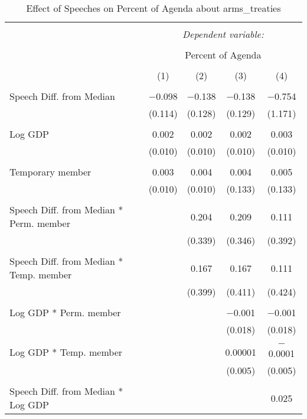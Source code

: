 
\begin{table}[!htbp] \centering 
  \caption{Effect of Speeches on Percent of Agenda about arms_treaties} 
  \label{} 
\begin{tabular}{@{\extracolsep{5pt}}lcccc} 
\\[-1.8ex]\hline 
\hline \\[-1.8ex] 
 & \multicolumn{4}{c}{\textit{Dependent variable:}} \\ 
\cline{2-5} 
\\[-1.8ex] & \multicolumn{4}{c}{Percent of Agenda} \\ 
\\[-1.8ex] & (1) & (2) & (3) & (4)\\ 
\hline \\[-1.8ex] 
 Speech Diff. from Median & $-$0.098 & $-$0.138 & $-$0.138 & $-$0.754 \\ 
  & (0.114) & (0.128) & (0.129) & (1.171) \\ 
  & & & & \\ 
 Log GDP & 0.002 & 0.002 & 0.002 & 0.003 \\ 
  & (0.010) & (0.010) & (0.010) & (0.010) \\ 
  & & & & \\ 
 Temporary member & 0.003 & 0.004 & 0.004 & 0.005 \\ 
  & (0.010) & (0.010) & (0.133) & (0.133) \\ 
  & & & & \\ 
 Speech Diff. from Median * Perm. member &  & 0.204 & 0.209 & 0.111 \\ 
  &  & (0.339) & (0.346) & (0.392) \\ 
  & & & & \\ 
 Speech Diff. from Median * Temp. member &  & 0.167 & 0.167 & 0.111 \\ 
  &  & (0.399) & (0.411) & (0.424) \\ 
  & & & & \\ 
 Log GDP * Perm. member &  &  & $-$0.001 & $-$0.001 \\ 
  &  &  & (0.018) & (0.018) \\ 
  & & & & \\ 
 Log GDP * Temp. member &  &  & 0.00001 & $-$0.0001 \\ 
  &  &  & (0.005) & (0.005) \\ 
  & & & & \\ 
 Speech Diff. from Median * Log GDP &  &  &  & 0.025 \\ 

\end{tabular}
\end{table}
